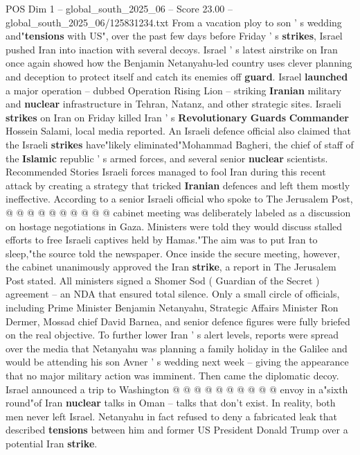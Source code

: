\begin{textsample}{POS Dim 1 – global\_south\_2025\_06 – Score 23.00 – global\_south\_2025\_06/125831234.txt}  \label{ex:f1_pos_214}
From a vacation ploy to son ' s wedding and"\textbf{tensions} with US", over the past few days before Friday ' s \textbf{strikes}, Israel pushed Iran into inaction with several decoys.
Israel ' s latest airstrike on Iran once again showed how the Benjamin Netanyahu-led country uses clever planning and deception to protect itself and catch its enemies off \textbf{guard}.
Israel \textbf{launched} a major operation -- dubbed Operation Rising Lion -- striking \textbf{Iranian} military and \textbf{nuclear} infrastructure in Tehran, Natanz, and other strategic sites.
Israeli \textbf{strikes} on Iran on Friday killed Iran ' s \textbf{Revolutionary} \textbf{Guards} \textbf{Commander} Hossein Salami, local media reported.
An Israeli defence official also claimed that the Israeli \textbf{strikes} have"likely eliminated"Mohammad Bagheri, the chief of staff of the \textbf{Islamic} republic ' s armed forces, and several senior \textbf{nuclear} scientists.
Recommended Stories Israeli forces managed to fool Iran during this recent attack by creating a strategy that tricked \textbf{Iranian} defences and left them mostly ineffective.
According to a senior Israeli official who spoke to The Jerusalem Post, @ @ @ @ @ @ @ @ @ @ cabinet meeting was deliberately labeled as a discussion on hostage negotiations in Gaza.
Ministers were told they would discuss stalled efforts to free Israeli captives held by Hamas."The aim was to put Iran to sleep,"the source told the newspaper.
Once inside the secure meeting, however, the cabinet unanimously approved the Iran \textbf{strike}, a report in The Jerusalem Post stated.
All ministers signed a Shomer Sod ( Guardian of the Secret ) agreement -- an NDA that ensured total silence.
Only a small circle of officials, including Prime Minister Benjamin Netanyahu, Strategic Affairs Minister Ron Dermer, Mossad chief David Barnea, and senior defence figures were fully briefed on the real objective.
To further lower Iran ' s alert levels, reports were spread over the media that Netanyahu was planning a family holiday in the Galilee and would be attending his son Avner ' s wedding next week -- giving the appearance that no major military action was imminent.
Then came the diplomatic decoy.
Israel announced a trip to Washington @ @ @ @ @ @ @ @ @ @ envoy in a"sixth round"of Iran \textbf{nuclear} talks in Oman -- talks that don't exist.
In reality, both men never left Israel.
Netanyahu in fact refused to deny a fabricated leak that described \textbf{tensions} between him and former US President Donald Trump over a potential Iran \textbf{strike}.

\end{textsample}
